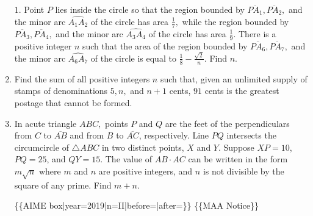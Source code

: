 \documentclass{article}
\begin{document}
\begin{enumerate}[label=\arabic*., itemsep=0.5em]
\(1.\) Point \(P\) lies inside the circle so that the region bounded by \(\overline{PA_1},\overline{PA_2},\) and the minor arc \(\widehat{A_1A_2}\) of the circle has area \(\tfrac{1}{7},\) while the region bounded by \(\overline{PA_3},\overline{PA_4},\) and the minor arc \(\widehat{A_3A_4}\) of the circle has area \(\tfrac{1}{9}.\) There is a positive integer \(n\) such that the area of the region bounded by \(\overline{PA_6},\overline{PA_7},\) and the minor arc \(\widehat{A_6A_7}\) of the circle is equal to \(\tfrac{1}{8}-\tfrac{\sqrt2}{n}.\) Find \(n.\)\par \vspace{0.5em}\item Find the sum of all positive integers \(n\) such that, given an unlimited supply of stamps of denominations \(5,n,\) and \(n+1\) cents, \(91\) cents is the greatest postage that cannot be formed.\par \vspace{0.5em}\item In acute triangle \(ABC,\) points \(P\) and \(Q\) are the feet of the perpendiculars from \(C\) to \(\overline{AB}\) and from \(B\) to \(\overline{AC}\), respectively. Line \(PQ\) intersects the circumcircle of \(\triangle ABC\) in two distinct points, \(X\) and \(Y\). Suppose \(XP=10\), \(PQ=25\), and \(QY=15\). The value of \(AB\cdot AC\) can be written in the form \(m\sqrt n\) where \(m\) and \(n\) are positive integers, and \(n\) is not divisible by the square of any prime. Find \(m+n\).



\{\{AIME box|year=2019|n=II|before=|after=\}\}
\{\{MAA Notice\}\}\par \vspace{0.5em}
\end{enumerate}
\end{document}
